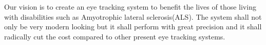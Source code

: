 Our vision is to create an eye tracking system to benefit the lives of those living with disabilities such as Amyotrophic lateral sclerosis(ALS). The system shall not only be very modern looking but it shall perform with great precision and it shall radically cut the cost compared to other present eye tracking systems. 